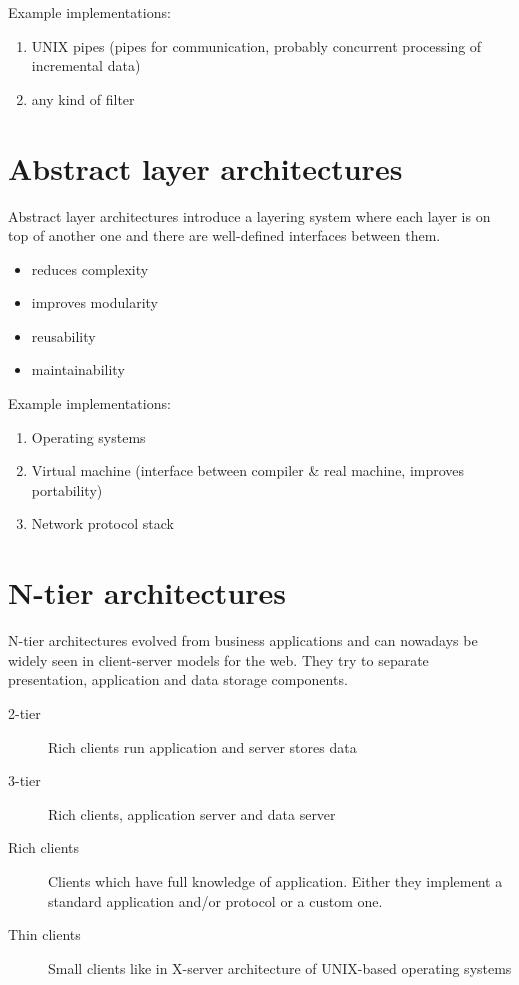 \documentclass[a4paper]{report}
\begin{document}
Example implementations:

\begin{enumerate}
  \item UNIX pipes (pipes for communication, probably concurrent processing of incremental data)
  \item any kind of filter
\end{enumerate}

\section{Abstract layer architectures}

Abstract layer architectures introduce a layering system where each layer is
on top of another one and there are well-defined interfaces between them.

\begin{itemize}
  \item reduces complexity
  \item improves modularity
  \item reusability
  \item maintainability
\end{itemize}

Example implementations:

\begin{enumerate}
  \item Operating systems
  \item Virtual machine (interface between compiler \& real machine,
          improves portability)
  \item Network protocol stack
\end{enumerate}

\section{N-tier architectures}

N-tier architectures evolved from business applications and can nowadays be
widely seen in client-server models for the web. They try to separate
presentation, application and data storage components.

\begin{description}
  \item[2-tier]
    Rich clients run application and server stores data
  \item[3-tier]
    Rich clients, application server and data server
  \item[Rich clients]
    Clients which have full knowledge of application.
    Either they implement a standard application and/or protocol
    or a custom one.
  \item[Thin clients]
    Small clients like in X-server architecture of UNIX-based operating
    systems
\end{description}
\end{document}
